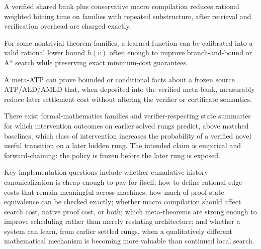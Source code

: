 \begin{conjecture}
A verified shared bank plus conservative macro compilation reduces rational weighted hitting time on families with repeated substructure, after retrieval and verification overhead are charged exactly.
\end{conjecture}

\begin{conjecture}
For some nontrivial theorem families, a learned function can be calibrated into a valid rational lower bound $h(v)$ often enough to improve branch-and-bound or A* search while preserving exact minimum-cost guarantees.
\end{conjecture}

\begin{conjecture}
A meta-ATP can prove bounded or conditional facts about a frozen source ATP/ALD/AMLD that, when deposited into the verified meta-bank, measurably reduce later settlement cost without altering the verifier or certificate semantics.
\end{conjecture}

\begin{conjecture}
There exist formal-mathematics families and verifier-respecting state summaries for which intervention outcomes on earlier solved rungs predict, above matched baselines, which class of intervention increases the probability of a verified novel useful transition on a later hidden rung. The intended claim is empirical and forward-chaining: the policy is frozen before the later rung is exposed.
\end{conjecture}

Key implementation questions include whether cumulative-history canonicalization is cheap enough to pay for itself; how to define rational edge costs that remain meaningful across machines; how much of proof-state equivalence can be checked exactly; whether macro compilation should affect search cost, native proof cost, or both; which meta-theorems are strong enough to improve scheduling rather than merely restating architecture; and whether a system can learn, from earlier settled rungs, when a qualitatively different mathematical mechanism is becoming more valuable than continued local search.
